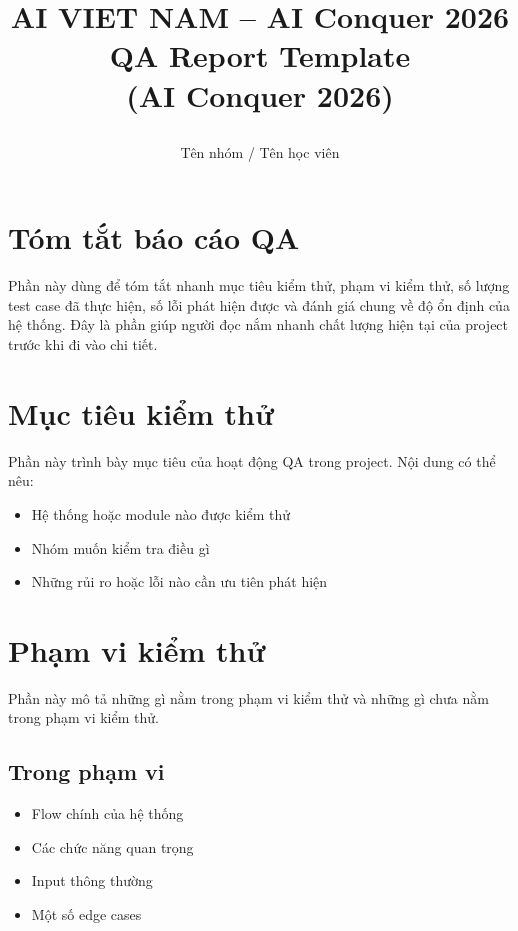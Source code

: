 \documentclass[12pt]{ai_conquer2026}
\title{%
  \begin{center}
        \Large {AI VIET NAM -- AI Conquer 2026}\\[.5ex]  
        \Huge \textbf{QA Report Template \\ 
        (AI Conquer 2026)}\\[.5ex]
  \end{center}
}
\author{
        \begin{minipage}{\textwidth}
        \centering
        {
        \vspace{-1.5em}
          Tên nhóm / Tên học viên
        }\\
      \end{minipage}
    }
\date{}
\begin{document}
\maketitle
\vspace{-5.5em}
\setlength{\epigraphwidth}{0.6\textwidth}

\section{Tóm tắt báo cáo QA}

Phần này dùng để tóm tắt nhanh mục tiêu kiểm thử, phạm vi kiểm thử, số lượng test case đã thực hiện, số lỗi phát hiện được và đánh giá chung về độ ổn định của hệ thống. Đây là phần giúp người đọc nắm nhanh chất lượng hiện tại của project trước khi đi vào chi tiết.

\newpage
\setcounter{tocdepth}{2}
\tableofcontents
\thispagestyle{fancy}

\newpage
\section{Mục tiêu kiểm thử}

Phần này trình bày mục tiêu của hoạt động QA trong project. Nội dung có thể nêu:
\begin{itemize}
    \item Hệ thống hoặc module nào được kiểm thử
    \item Nhóm muốn kiểm tra điều gì
    \item Những rủi ro hoặc lỗi nào cần ưu tiên phát hiện
\end{itemize}

\section{Phạm vi kiểm thử}

Phần này mô tả những gì nằm trong phạm vi kiểm thử và những gì chưa nằm trong phạm vi kiểm thử.

\subsection{Trong phạm vi}
\begin{itemize}
    \item Flow chính của hệ thống
    \item Các chức năng quan trọng
    \item Input thông thường
    \item Một số edge cases
\end{itemize}
\end{document}
